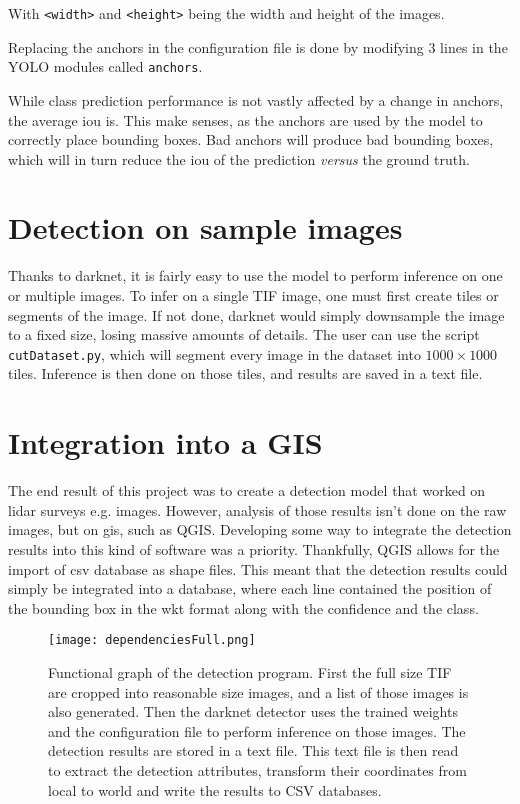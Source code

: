 With \verb|<width>| and \verb|<height>| being the width and height of the images. 

Replacing the anchors in the configuration file is done by modifying 3 lines in the YOLO modules called \verb|anchors|. 

While class prediction performance is not vastly affected by a change in anchors, the average \gls{iou} is. This make senses, as the anchors are used by the model to correctly place bounding boxes. Bad anchors will produce bad bounding boxes, which will in turn reduce the \gls{iou} of the prediction \textit{versus} the ground truth.


\section{Detection on sample images}
Thanks to darknet, it is fairly easy to use the model to perform inference on one or multiple images. To infer on a single TIF image, one must first create tiles or segments of the image. If not done, darknet would simply downsample the image to a fixed size, losing massive amounts of details. The user can use the script \verb|cutDataset.py|, which will segment every image in the dataset into $1000 \times 1000$ tiles. Inference is then done on those tiles, and results are saved in a text file.

\section{Integration into a GIS}
The end result of this project was to create a detection model that worked on \gls{lidar} surveys e.g. images. However, analysis of those results isn't done on the raw images, but on \gls{gis}, such as QGIS\cite{QGIS_software}. Developing some way to integrate the detection results into this kind of software was a priority. Thankfully, QGIS allows for the import of \gls{csv} database as shape files. This meant that the detection results could simply be integrated into a database, where each line contained the position of the bounding box in the \gls{wkt} format along with the confidence and the class. 

\begin{figure}
	\centering
	\texttt{[image: dependenciesFull.png]}
	\caption[Functional graph of the detection program]{Functional graph of the detection program. First the full size TIF are cropped into reasonable size images, and a list of those images is also generated. Then the darknet detector uses the trained weights and the configuration file to perform inference on those images. The detection results are stored in a text file. This text file is then read to extract the detection attributes, transform their coordinates from local to world and write the results to CSV databases.}
	\label{}
\end{figure}

